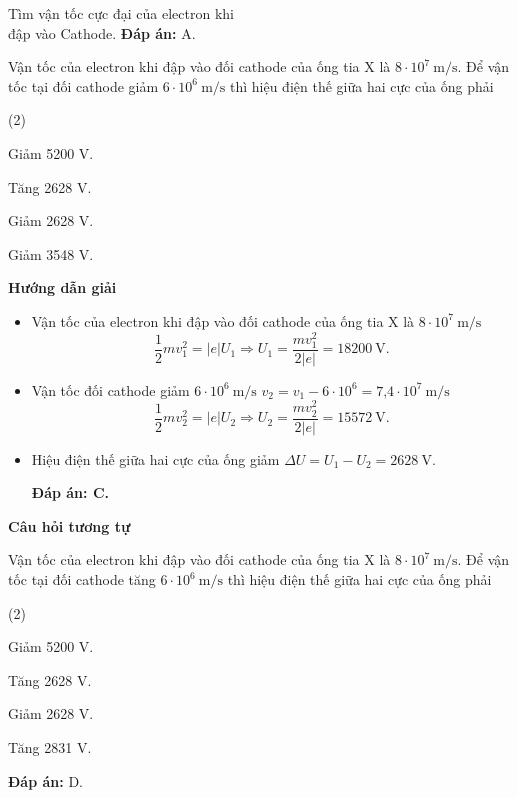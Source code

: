\begin{dang}{Tìm vận tốc cực đại của electron khi\\ đập vào Cathode.}
{		\textbf{Đáp án:} A.
	}
	
	{Vận tốc của electron khi đập vào đối cathode của ống tia X là $8\cdot 10^7 \ \text{m/s}$. Để vận tốc tại đối cathode  giảm $6\cdot 10^6\ \text{m/s}$ thì hiệu điện thế giữa hai cực của ống phải 
		\begin{mcq}(2)
			\item Giảm 5200 V.
			\item Tăng 2628 V.
			\item Giảm 2628 V.
			\item Giảm 3548 V.
		\end{mcq}
	}
	{\begin{center}
			\textbf{Hướng dẫn giải}
		\end{center}
		\begin{itemize}
			\item Vận tốc của electron khi đập vào đối cathode của ống tia X là $8 \cdot 10^7 \ \text{m/s}$
			\begin{equation*}
				\dfrac{1}{2}mv^2_1 =|e| U_1 \Rightarrow U_1=\dfrac{mv^2_1}{2|e|}=18200\ \text{V}.
			\end{equation*}
			\item Vận tốc đối cathode giảm $6 \cdot 10^6\ \text{m/s}$ $v_2=v_1 - 6 \cdot 10^6 = \text{7,4}\cdot 10^7\ \text{m/s}$
			\begin{equation*}
				\dfrac{1}{2}mv^2_2 =|e| U_2 \Rightarrow U_2=\dfrac{mv^2_2}{2|e|}=15572\ \text{V}.
			\end{equation*}
			\item Hiệu điện thế giữa hai cực của ống giảm $\Delta U = U_1 - U_2 =2628\ \text{V}$.
			
			\textbf{Đáp án: C.}
		\end{itemize}
		
		\begin{center}
			\textbf{Câu hỏi tương tự}
		\end{center}
		
		Vận tốc của electron khi đập vào đối cathode của ống tia X là $8\cdot 10^7 \ \text{m/s}$. Để vận tốc tại đối cathode  tăng $6\cdot 10^6\ \text{m/s}$ thì hiệu điện thế giữa hai cực của ống phải 
		\begin{mcq}(2)
			\item Giảm 5200 V.
			\item Tăng 2628 V.
			\item Giảm 2628 V.
			\item Tăng 2831 V.
		\end{mcq}
		
		\textbf{Đáp án:} D.
		
	}
	
\end{dang}


